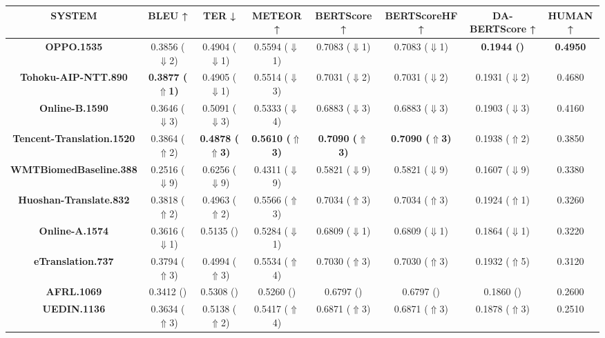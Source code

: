 \begin{table*}[ht]
\centering
\tiny
\begin{tabular}{cccccccc}
\toprule
\textbf{SYSTEM} & \textbf{BLEU ↑} & \textbf{TER ↓} & \textbf{METEOR ↑} & \textbf{BERTScore ↑} & \textbf{BERTScoreHF ↑} & \textbf{DA-BERTScore ↑} & \textbf{HUMAN ↑} \\
\midrule
\textbf{OPPO.1535} & {0.3856 ($\Downarrow$2)} & {0.4904 ($\Downarrow$1)} & {0.5594 ($\Downarrow$1)} & {0.7083 ($\Downarrow$1)} & {0.7083 ($\Downarrow$1)} & \textbf{0.1944 (\checkmark0)} & \textbf{0.4950} \\
\textbf{Tohoku-AIP-NTT.890} & \textbf{0.3877 ($\Uparrow$1)} & {0.4905 ($\Downarrow$1)} & {0.5514 ($\Downarrow$3)} & {0.7031 ($\Downarrow$2)} & {0.7031 ($\Downarrow$2)} & {0.1931 ($\Downarrow$2)} & {0.4680} \\
\textbf{Online-B.1590} & {0.3646 ($\Downarrow$3)} & {0.5091 ($\Downarrow$3)} & {0.5333 ($\Downarrow$4)} & {0.6883 ($\Downarrow$3)} & {0.6883 ($\Downarrow$3)} & {0.1903 ($\Downarrow$3)} & {0.4160} \\
\textbf{Tencent-Translation.1520} & {0.3864 ($\Uparrow$2)} & \textbf{0.4878 ($\Uparrow$3)} & \textbf{0.5610 ($\Uparrow$3)} & \textbf{0.7090 ($\Uparrow$3)} & \textbf{0.7090 ($\Uparrow$3)} & {0.1938 ($\Uparrow$2)} & {0.3850} \\
\textbf{WMTBiomedBaseline.388} & {0.2516 ($\Downarrow$9)} & {0.6256 ($\Downarrow$9)} & {0.4311 ($\Downarrow$9)} & {0.5821 ($\Downarrow$9)} & {0.5821 ($\Downarrow$9)} & {0.1607 ($\Downarrow$9)} & {0.3380} \\
\textbf{Huoshan-Translate.832} & {0.3818 ($\Uparrow$2)} & {0.4963 ($\Uparrow$2)} & {0.5566 ($\Uparrow$3)} & {0.7034 ($\Uparrow$3)} & {0.7034 ($\Uparrow$3)} & {0.1924 ($\Uparrow$1)} & {0.3260} \\
\textbf{Online-A.1574} & {0.3616 ($\Downarrow$1)} & {0.5135 (\checkmark0)} & {0.5284 ($\Downarrow$1)} & {0.6809 ($\Downarrow$1)} & {0.6809 ($\Downarrow$1)} & {0.1864 ($\Downarrow$1)} & {0.3220} \\
\textbf{eTranslation.737} & {0.3794 ($\Uparrow$3)} & {0.4994 ($\Uparrow$3)} & {0.5534 ($\Uparrow$4)} & {0.7030 ($\Uparrow$3)} & {0.7030 ($\Uparrow$3)} & {0.1932 ($\Uparrow$5)} & {0.3120} \\
\textbf{AFRL.1069} & {0.3412 (\checkmark0)} & {0.5308 (\checkmark0)} & {0.5260 (\checkmark0)} & {0.6797 (\checkmark0)} & {0.6797 (\checkmark0)} & {0.1860 (\checkmark0)} & {0.2600} \\
\textbf{UEDIN.1136} & {0.3634 ($\Uparrow$3)} & {0.5138 ($\Uparrow$2)} & {0.5417 ($\Uparrow$4)} & {0.6871 ($\Uparrow$3)} & {0.6871 ($\Uparrow$3)} & {0.1878 ($\Uparrow$3)} & {0.2510} \\

\end{tabular}
\end{table*}

